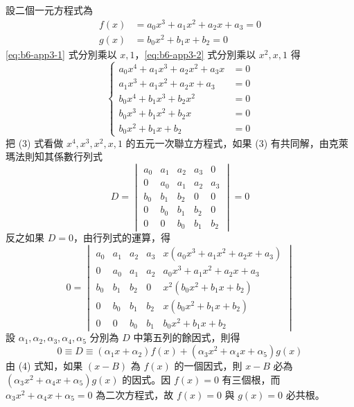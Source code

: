 設二個一元方程式為
\begin{align}
f(x) &= a_0 x^3 + a_1 x^2 + a_2 x + a_3 = 0 \label{eq:b6-app3-1} \\
g(x) &= b_0 x^2 + b_1 x + b_2 = 0 \label{eq:b6-app3-2}
\end{align}
\eqref{eq:b6-app3-1} 式分別乘以 $x, 1$，\eqref{eq:b6-app3-2} 式分別乘以 $x^2, x, 1$ 得
\begin{equation}
\left\{\begin{aligned}
a_0 x^4 + a_1 x^3 + a_2 x^2 + a_3 x &= 0 \\
a_1 x^3 + a_1 x^2 + a_2 x + a_3 &= 0 \\
b_0 x^4 + b_1 x^3 + b_2 x^2 &= 0 \\
b_0 x^3 + b_1 x^2 + b_2 x &= 0 \\
b_0 x^2 + b_1 x + b_2 &= 0
\end{aligned}\right. \label{eq:b6-app3-6}
\end{equation}
把 (3) 式看做 $x^4, x^3, x^2, x, 1$ 的五元一次聯立方程式，如果 (3) 有共同解，由克萊瑪法則知其係數行列式
\[ D = \begin{vmatrix}
a_0 & a_1 & a_2 & a_3 & 0 \\
0 & a_0 & a_1 & a_2 & a_3 \\
b_0 & b_1 & b_2 & 0 & 0 \\
0 & b_0 & b_1 & b_2 & 0 \\
0 & 0 & b_0 & b_1 & b_2
\end{vmatrix} = 0 \]
反之如果 $D=0$，由行列式的運算，得
\[ 0 = \begin{vmatrix}
a_0 & a_1 & a_2 & a_3 & x(a_0 x^3 + a_1 x^2 + a_2 x + a_3) \\
0 & a_0 & a_1 & a_2 & a_0 x^3 + a_1 x^2 + a_2 x + a_3 \\
b_0 & b_1 & b_2 & 0 & x^2(b_0 x^2 + b_1 x + b_2) \\
0 & b_0 & b_1 & b_2 & x(b_0 x^2 + b_1 x + b_2) \\
0 & 0 & b_0 & b_1 & b_0 x^2 + b_1 x + b_2
\end{vmatrix} \]
設 $\alpha_1, \alpha_2, \alpha_3, \alpha_4, \alpha_5$ 分別為 $D$ 中第五列的餘因式，則得
\begin{equation}
0 \equiv D \equiv (\alpha_1 x + \alpha_2) f(x) + (\alpha_3 x^2 + \alpha_4 x + \alpha_5) g(x) \label{eq:b6-app3-4}
\end{equation}
由 (4) 式知，如果 $(x-B)$ 為 $f(x)$ 的一個因式，則 $x-B$ 必為 $(\alpha_3 x^2 + \alpha_4 x + \alpha_5) g(x)$ 的因式。因 $f(x)=0$ 有三個根，而 $\alpha_3 x^2 + \alpha_4 x + \alpha_5 = 0$ 為二次方程式，故 $f(x)=0$ 與 $g(x)=0$ 必共根。

